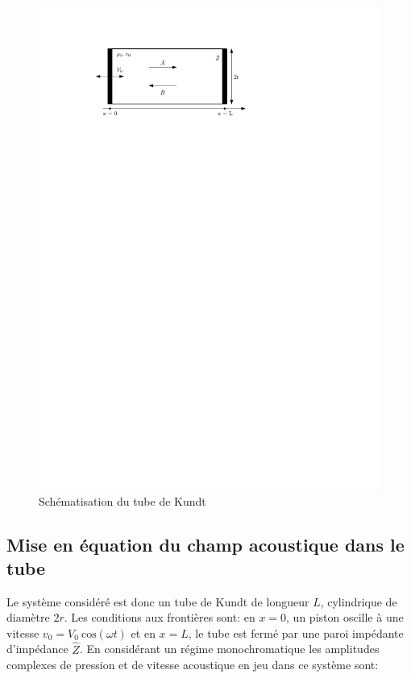 \documentclass[a4paper, 11pt]{article}
\begin{document}
\begin{figure}[H]
	\centering 
	\includegraphics[scale=1]{Figures/tubeKundt_schema.pdf}
	\caption{Schématisation du tube de Kundt}
	\label{fig:schematK} 
\end{figure}

\subsection{Mise en équation du champ acoustique dans le tube}

Le système considéré est donc un tube de Kundt de longueur $L$, cylindrique de diamètre $2r$. Les conditions aux frontières sont: en $x = 0$, un piston oscille à une vitesse $v_0 = V_0 \:  \text{cos}(\omega t)$ et en $x = L$, le tube est fermé par une paroi impédante d'impédance $\hat{Z}$. En considérant un régime monochromatique les amplitudes complexes de pression et de vitesse acoustique en jeu dans ce système sont:
\end{document}
